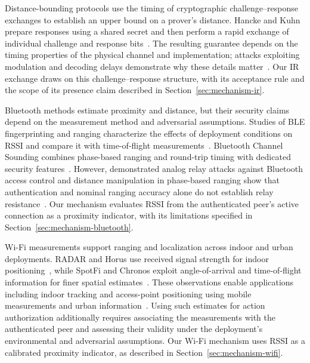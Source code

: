 \documentclass[sigconf,authordraft]{acmart}
\begin{document}
Distance-bounding protocols use the timing of cryptographic challenge--response exchanges to establish an upper bound on a prover's distance.
Hancke and Kuhn prepare responses using a shared secret and then perform a rapid exchange of individual challenge and response bits~\cite{hancke2005rfid}.
The resulting guarantee depends on the timing properties of the physical channel and implementation; attacks exploiting modulation and decoding delays demonstrate why these details matter~\cite{hancke2008attacks}.
Our IR exchange draws on this challenge--response structure, with its acceptance rule and the scope of its presence claim described in Section~\ref{sec:mechanism-ir}.

Bluetooth methods estimate proximity and distance, but their security claims depend on the measurement method and adversarial assumptions.
Studies of BLE fingerprinting and ranging characterize the effects of deployment conditions on RSSI and compare it with time-of-flight measurements~\cite{faragher2015location,giovanelli2018rssi}.
Bluetooth Channel Sounding combines phase-based ranging and round-trip timing with dedicated security features~\cite{woolley2024channelsounding}.
However, demonstrated analog relay attacks against Bluetooth access control and distance manipulation in phase-based ranging show that authentication and nominal ranging accuracy alone do not establish relay resistance~\cite{staat2022analog}.
Our mechanism evaluates RSSI from the authenticated peer's active connection as a proximity indicator, with its limitations specified in Section~\ref{sec:mechanism-bluetooth}.

Wi-Fi measurements support ranging and localization across indoor and urban deployments.
RADAR and Horus use received signal strength for indoor positioning~\cite{bahl2000radar,youssef2005horus}, while SpotFi and Chronos exploit angle-of-arrival and time-of-flight information for finer spatial estimates~\cite{kotaru2015spotfi,vasisht2016decimeter}.
These observations enable applications including indoor tracking and access-point positioning using mobile measurements and urban information~\cite{bahl2000radar,youssef2005horus,choi2024enhanced}.
Using such estimates for action authorization additionally requires associating the measurements with the authenticated peer and assessing their validity under the deployment's environmental and adversarial assumptions.
Our Wi-Fi mechanism uses RSSI as a calibrated proximity indicator, as described in Section~\ref{sec:mechanism-wifi}.
\end{document}
